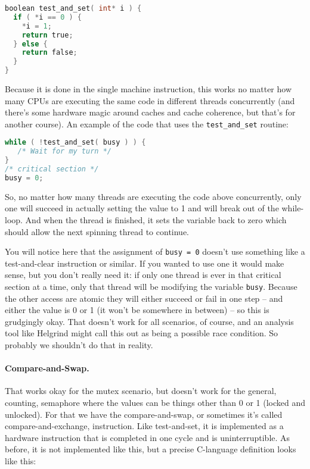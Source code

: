 \begin{lstlisting}[language=C]
boolean test_and_set( int* i ) {
  if ( *i == 0 ) {
    *i = 1;
    return true;
  } else {
    return false;
  }
}
\end{lstlisting}

Because it is done in the single machine instruction, this works no matter how many CPUs are executing the same code in different threads concurrently (and there's some hardware magic around caches and cache coherence, but that's for another course). An example of the code that uses the \texttt{test\_and\_set} routine:

\begin{lstlisting}[language=C]
while ( !test_and_set( busy ) ) {
   /* Wait for my turn */
}
/* critical section */
busy = 0;
\end{lstlisting}

So, no matter how many threads are executing the code above concurrently, only one will succeed in actually setting the value to 1 and will break out of the while-loop. And when the thread is finished, it sets the variable back to zero which should allow the next spinning thread to continue.

You will notice here that the assignment of \texttt{busy = 0} doesn't use something like a test-and-clear instruction or similar. If you wanted to use one it would make sense, but you don't really need it: if only one thread is ever in that critical section at a time, only that thread will be modifying the variable \texttt{busy}. Because the other access are atomic they will either succeed or fail in one step -- and either the value is 0 or 1 (it won't be somewhere in between) -- so this is grudgingly okay. That doesn't work for all scenarios, of course, and an analysis tool like Helgrind might call this out as being a possible race condition. So probably we shouldn't do that in reality.

\paragraph{Compare-and-Swap.} That works okay for the mutex scenario, but doesn't work for the general, counting, semaphore where the values can be things other than 0 or 1 (locked and unlocked). For that we have the compare-and-swap, or sometimes it's called compare-and-exchange, instruction. Like test-and-set, it is implemented as a hardware instruction that is completed in one cycle and is uninterruptible. As before, it is not implemented like this, but a precise C-language definition looks like this:

